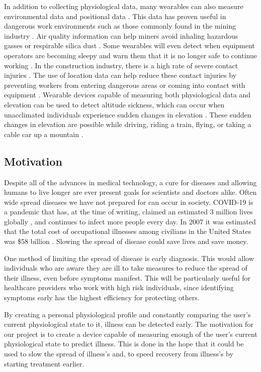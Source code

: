 In addition to collecting physiological data, many wearables can also measure
environmental data and positional data \cite{Seneviratne2017}. This data has 
proven useful in dangerous work environments such as those commonly 
found in the mining industry \cite{Mardonova2018}. Air quality information can
help miners avoid inhaling hazardous gasses or respirable silica dust 
\cite{Mardonova2018}. Some wearables will even detect when equipment operators
are becoming sleepy and warn them that it is no longer safe to continue working
\cite{Mardonova2018}. In the construction industry, there is a high rate of 
severe contact injuries \cite{Awolusi2018}. The use of location data can help 
reduce these contact injuries by preventing workers from entering dangerous 
areas or coming into contact with equipment \cite{Awolusi2018}. Wearable devices
capable of measuring both physiological data and elevation can be used to detect
altitude sickness, which can occur when unacclimated individuals experience sudden 
changes in elevation \cite{Muza2018}. These sudden changes in elevation are 
possible while driving, riding a train, flying, or taking a cable car up a mountain 
\cite{Muza2018}.

\subsection{Motivation}

Despite all of the advances in medical technology, a cure for diseases and
allowing humans to live longer are ever present goals for scientists and 
doctors alike.  Often wide spread diseases we have not prepared for can occur in
society.  COVID-19 is a pandemic that
has, at the time of writing, claimed an estimated 3 million lives globally
\cite{johns-hopkins-corona-chan}, and continues to infect more people every
day.  In 2007 it was estimated that the total cost of occupational illnesses
among civilians in the United States was \$58 billion \cite{Leigh2011}.
Slowing the spread of disease could save lives and save money.

One method of limiting the spread of disease is early diagnosis.  This would
allow individuals who are aware they are ill to take measures to reduce the
spread of their illness, even before symptoms manifest.  This will be
particularly useful for healthcare providers who work with high risk
individuals, since identifying symptoms early has the highest efficiency for
protecting others.

By creating a personal physiological profile and constantly
comparing the user's current physiological state to it, illness can be detected
early.  The motivation for our project is to create a device capable of measuring 
enough of the user's current physiological state to predict illness.  This is done 
in the hope that it could be used to slow the spread of illness's and, to speed
recovery from illness's by starting treatment earlier.


